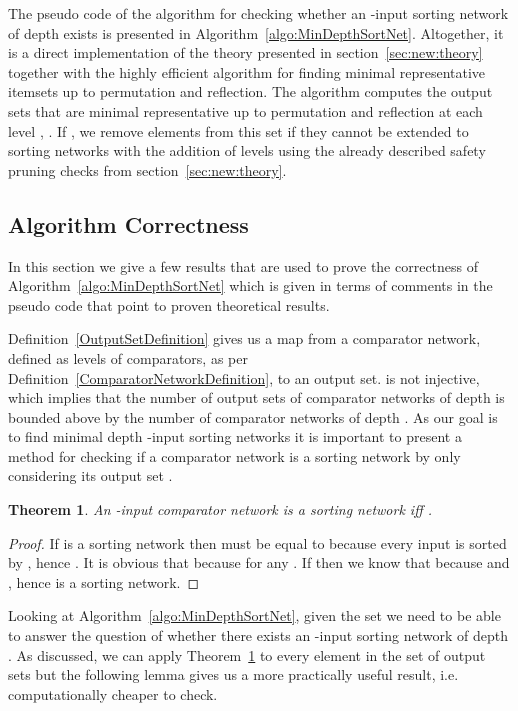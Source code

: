 \documentclass[13pt,a4paper]{article}
\newtheorem{theorem}{Theorem}[section]
\begin{document}
The pseudo code of the algorithm for checking whether an -input sorting network of depth  exists is presented in Algorithm~\ref{algo:MinDepthSortNet}. Altogether, it is a direct implementation of the theory presented in section~\ref{sec:new:theory} together with the highly efficient algorithm \cite{Marinov:SortingNetworks:ThirdLevel} for finding minimal representative itemsets up to permutation and reflection. The algorithm computes the output sets that are minimal representative up to permutation and reflection at each level , . If , we remove elements from this set if they cannot be extended to sorting networks with the addition of  levels using the already described safety pruning checks from section~\ref{sec:new:theory}.

\subsection{Algorithm Correctness}
\label{sec:algorithm:correctness}
In this section we give a few results that are used to prove the correctness of Algorithm~\ref{algo:MinDepthSortNet} which is given in terms of comments in the pseudo code that point to proven theoretical results.

Definition~\ref{OutputSetDefinition} gives us a map  from a comparator network, defined as levels of comparators, as per Definition~\ref{ComparatorNetworkDefinition}, to an output set.  is not injective, which implies that the number of output sets of comparator networks of depth  is bounded above by the number of comparator networks of depth . As our goal is to find minimal depth -input sorting networks it is important to present a method for checking if a comparator network  is a sorting network by only considering its output set .

\begin{theorem}
\label{SortinNetworkOutputSetSizeTheorem}
An -input comparator network  is a sorting network iff .
\end{theorem}

\begin{proof}
If  is a sorting network then  must be equal to  because every input is sorted by , hence . It is obvious that  because  for any . If  then we know that  because  and , hence  is a sorting network.
\end{proof}

Looking at Algorithm~\ref{algo:MinDepthSortNet}, given the set  we need to be able to answer the question of whether there exists an -input sorting network of depth . As discussed, we can apply Theorem~\ref{SortinNetworkOutputSetSizeTheorem} to every element in the set of output sets  but the following lemma gives us a more practically useful result, i.e. computationally cheaper to check.
\end{document}
